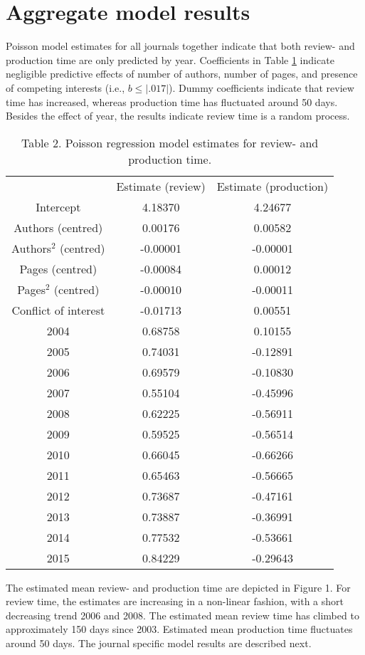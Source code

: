 \section*{Aggregate model results}
Poisson model estimates for all journals together indicate that both review- and production time are only predicted by year. Coefficients in Table \ref{tab:tab2} indicate negligible predictive effects of number of authors, number of pages, and presence of competing interests (i.e., $b \leq |.017|$). Dummy coefficients indicate that review time has increased, whereas production time has fluctuated around 50 days. Besides the effect of year, the results indicate review time is a random process.

\begin{table}
\caption{Table 2. Poisson regression model estimates for review- and production time.}
\label{tab:tab2}
\begin{tabular}{ c c c }
             & Estimate (review) & Estimate (production) \\
    Intercept & 4.18370 & 4.24677 \\
    Authors (centred) & 0.00176 & 0.00582 \\
    Authors$^2$ (centred) & -0.00001 & -0.00001 \\
    Pages (centred) & -0.00084 & 0.00012 \\
    Pages$^2$ (centred) & -0.00010 & -0.00011 \\
    Conflict of interest & -0.01713 & 0.00551 \\
    2004  & 0.68758 & 0.10155 \\
    2005  & 0.74031 & -0.12891 \\
    2006  & 0.69579 & -0.10830 \\
    2007  & 0.55104 & -0.45996 \\
    2008  & 0.62225 & -0.56911 \\
    2009  & 0.59525 & -0.56514 \\
    2010  & 0.66045 & -0.66266 \\
    2011  & 0.65463 & -0.56665 \\
    2012  & 0.73687 & -0.47161 \\
    2013  & 0.73887 & -0.36991 \\
    2014  & 0.77532 & -0.53661 \\
    2015  & 0.84229 & -0.29643 \\
\end{tabular}
\end{table}

The estimated mean review- and production time are depicted in Figure 1. For review time, the estimates are increasing in a non-linear fashion, with a short decreasing trend 2006 and 2008. The estimated mean review time has climbed to approximately 150 days since 2003. Estimated mean production time fluctuates around 50 days. The journal specific model results are described next.